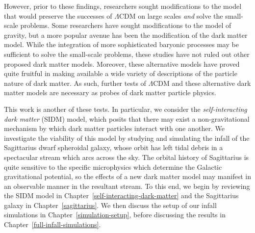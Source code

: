 However, prior to these findings, researchers sought modifications to the
model that would preserve the successes of \(\Lambda\)CDM on large scales
\emph{and} solve the small-scale problems. Some researchers have sought
modifications to the model of gravity, but a more popular avenue has been the
modification of the dark matter model.  While the integration of more
sophisticated baryonic processes may be sufficient to solve the small-scale
problems, these studies have not ruled out other proposed dark matter models.
Moreover, these alternative models have proved quite fruitful in making
available a wide variety of descriptions of the particle nature of dark
matter.  As such, further tests of \(\Lambda\)CDM and these alternative dark
matter models are necessary as probes of dark matter particle physics.

This work is another of these tests.  In particular, we consider the
\emph{self-interacting dark matter} (SIDM) model, which posits that there may
exist a non-gravitational mechanism by which dark matter particles interact
with one another.  We investigate the viability of this model by studying and
simulating the infall of the Sagittarius dwarf spheroidal galaxy, whose orbit
has left tidal debris in a spectacular stream which arcs across the sky.  The
orbital history of Sagittarius is quite sensitive to the specific microphysics
which determine the Galactic gravitational potential, so the effects of a new
dark matter model may manifest in an observable manner in the resultant
stream.  To this end, we begin by reviewing the SIDM model in
Chapter~\ref{self-interacting-dark-matter} and the Sagittarius galaxy in
Chapter~\ref{sagittarius}.  We then discuss the setup of our infall simulations
in Chapter~\ref{simulation-setup}, before discussing the results in
Chapter~\ref{full-infall-simulations}. 

